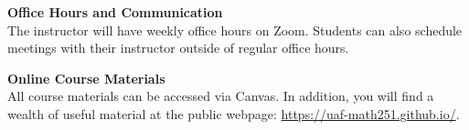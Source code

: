 \documentclass[12pt]{article}
\renewcommand{\emph}[1]{\textsf{\textbf{#1}}}
\newcommand{\localhead}[1]{\par\smallskip\textbf{#1}\nobreak\\}%
\def\heading#1{\localhead{\large\emph{#1}}}
\begin{document}
\heading{Office Hours and Communication}
The instructor will have weekly office hours on Zoom. Students can also schedule meetings with their instructor outside of regular office hours.


\heading{Online Course Materials}
All course materials can be accessed via Canvas. In addition, you will find a wealth of useful material at the public webpage: \href{https://uaf-math251.github.io/}{https://uaf-math251.github.io/}.

\end{document}
